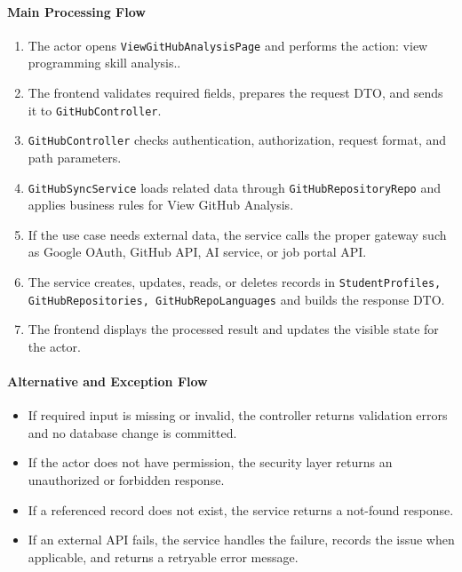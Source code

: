 \paragraph{Main Processing Flow}

\begin{enumerate}
    \item The actor opens \texttt{ViewGitHubAnalysisPage} and performs the action: view programming skill analysis..
    \item The frontend validates required fields, prepares the request DTO, and sends it to \texttt{GitHubController}.
    \item \texttt{GitHubController} checks authentication, authorization, request format, and path parameters.
    \item \texttt{GitHubSyncService} loads related data through \texttt{GitHubRepositoryRepo} and applies business rules for View GitHub Analysis.
    \item If the use case needs external data, the service calls the proper gateway such as Google OAuth, GitHub API, AI service, or job portal API.
    \item The service creates, updates, reads, or deletes records in \texttt{StudentProfiles, GitHubRepositories, GitHubRepoLanguages} and builds the response DTO.
    \item The frontend displays the processed result and updates the visible state for the actor.
\end{enumerate}

\paragraph{Alternative and Exception Flow}

\begin{itemize}
    \item If required input is missing or invalid, the controller returns validation errors and no database change is committed.
    \item If the actor does not have permission, the security layer returns an unauthorized or forbidden response.
    \item If a referenced record does not exist, the service returns a not-found response.
    \item If an external API fails, the service handles the failure, records the issue when applicable, and returns a retryable error message.
\end{itemize}


